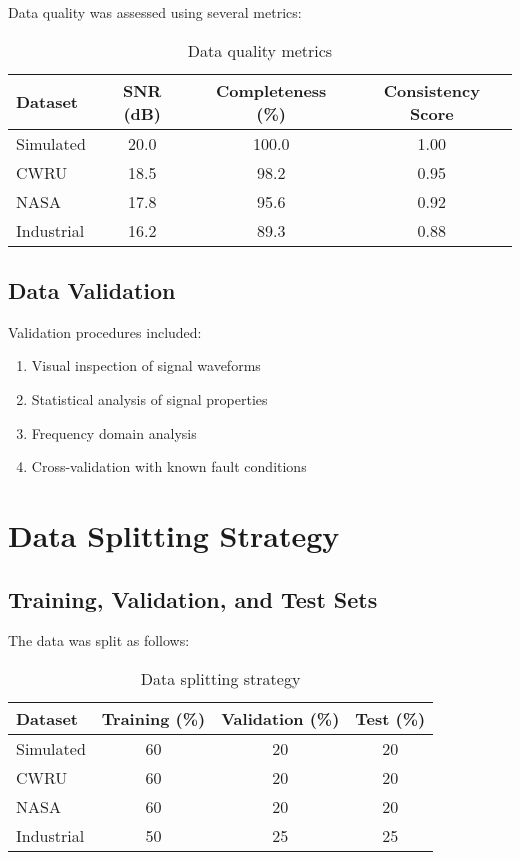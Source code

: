 Data quality was assessed using several metrics:

\begin{table}[H]
\centering
\caption{Data quality metrics}
\label{tab:quality_metrics}
\begin{tabular}{@{}lccc@{}}
\toprule
Dataset & SNR (dB) & Completeness (\%) & Consistency Score \\
\midrule
Simulated & 20.0 & 100.0 & 1.00 \\
CWRU & 18.5 & 98.2 & 0.95 \\
NASA & 17.8 & 95.6 & 0.92 \\
Industrial & 16.2 & 89.3 & 0.88 \\
\bottomrule
\end{tabular}
\end{table}

\subsection{Data Validation}

Validation procedures included:
\begin{enumerate}
    \item Visual inspection of signal waveforms
    \item Statistical analysis of signal properties
    \item Frequency domain analysis
    \item Cross-validation with known fault conditions
\end{enumerate}

\section{Data Splitting Strategy}

\subsection{Training, Validation, and Test Sets}

The data was split as follows:

\begin{table}[H]
\centering
\caption{Data splitting strategy}
\label{tab:data_splitting}
\begin{tabular}{@{}lccc@{}}
\toprule
Dataset & Training (\%) & Validation (\%) & Test (\%) \\
\midrule
Simulated & 60 & 20 & 20 \\
CWRU & 60 & 20 & 20 \\
NASA & 60 & 20 & 20 \\
Industrial & 50 & 25 & 25 \\
\bottomrule
\end{tabular}
\end{table}

